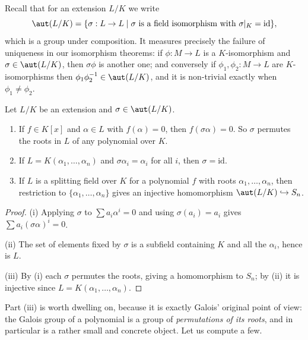 Recall that for an extension $L/K$ we write
$$\aut(L/K) = \{\sigma : L \to L \mid \sigma \text{ is a field isomorphism with } \sigma|_K = \mathrm{id}\},$$
which is a group under composition. It measures precisely the failure of uniqueness in our isomorphism theorems: if $\phi : M \to L$ is a $K$-isomorphism and $\sigma \in \aut(L/K)$, then $\sigma\phi$ is another one; and conversely if $\phi_1, \phi_2 : M \to L$ are $K$-isomorphisms then $\phi_1\phi_2^{-1} \in \aut(L/K)$, and it is non-trivial exactly when $\phi_1 \neq \phi_2$.

\begin{lemma}\label{lem:autbasic}
	Let $L/K$ be an extension and $\sigma \in \aut(L/K)$.
	\begin{enumerate}[label=(\roman*)]
		\item If $f \in K[x]$ and $\alpha \in L$ with $f(\alpha) = 0$, then $f(\sigma\alpha) = 0$. So $\sigma$ permutes the roots in $L$ of any polynomial over $K$.
		\item If $L = K(\alpha_1, \dots, \alpha_n)$ and $\sigma\alpha_i = \alpha_i$ for all $i$, then $\sigma = \mathrm{id}$.
		\item If $L$ is a splitting field over $K$ for a polynomial $f$ with roots $\alpha_1, \dots, \alpha_n$, then restriction to $\{\alpha_1,\dots,\alpha_n\}$ gives an injective homomorphism $\aut(L/K) \hookrightarrow S_n$.
	\end{enumerate}
\end{lemma}

\begin{proof}
	(i) Applying $\sigma$ to $\sum a_i \alpha^i = 0$ and using $\sigma(a_i) = a_i$ gives $\sum a_i (\sigma\alpha)^i = 0$.

	(ii) The set of elements fixed by $\sigma$ is a subfield containing $K$ and all the $\alpha_i$, hence is $L$.

	(iii) By (i) each $\sigma$ permutes the roots, giving a homomorphism to $S_n$; by (ii) it is injective since $L = K(\alpha_1,\dots,\alpha_n)$.
\end{proof}

Part (iii) is worth dwelling on, because it is exactly Galois' original point of view: the Galois group of a polynomial is a group of \emph{permutations of its roots}, and in particular is a rather small and concrete object. Let us compute a few.

